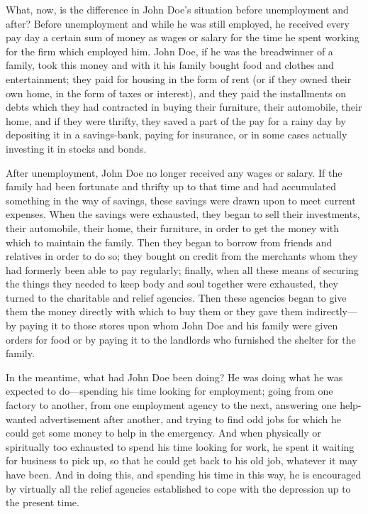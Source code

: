 \documentclass{book}
\begin{document}
What, now, is the difference in John Doe’s situation before unemployment and after? Before unemployment and while he was still employed, he received every pay day a certain sum of money as wages or salary for the time he spent working for the firm which employed him. John Doe, if he was the breadwinner of a family, took this money and with it his family bought food and clothes and entertainment; they paid for housing in the form of rent (or if they owned their own home, in the form of taxes or interest), and they paid the installments on debts which they had contracted in buying their furniture, their automobile, their home, and if they were thrifty, they saved a part of the pay for a rainy day by depositing it in a savings-bank, paying for insurance, or in some cases actually investing it in stocks and bonds.

After unemployment, John Doe no longer received any wages or salary. If the family had been fortunate and thrifty up to that time and had accumulated something in the way of savings, these savings were drawn upon to meet current expenses. When the savings were exhausted, they began to sell their investments, their automobile, their home, their furniture, in order to get the money with which to maintain the family. Then they began to borrow from friends and relatives in order to do so; they bought on credit from the merchants whom they had formerly been able to pay regularly; finally, when all these means of securing the things they needed to keep body and soul together were exhausted, they turned to the charitable and relief agencies. Then these agencies began to give them the money directly with which to buy them or they gave them indirectly—by paying it to those stores upon whom John Doe and his family were given orders for food or by paying it to the landlords who furnished the shelter for the family.

In the meantime, what had John Doe been doing? He was doing what he was expected to do—spending his time looking for employment; going from one factory to another, from one employment agency to the next, answering one help-wanted advertisement after another, and trying to find odd jobs for which he could get some money to help in the emergency. And when physically or spiritually too exhausted to spend his time looking for work, he spent it waiting for business to pick up, so that he could get back to his old job, whatever it may have been. And in doing this, and spending his time in this way, he is encouraged by virtually all the relief agencies established to cope with the depression up to the present time.
\end{document}
